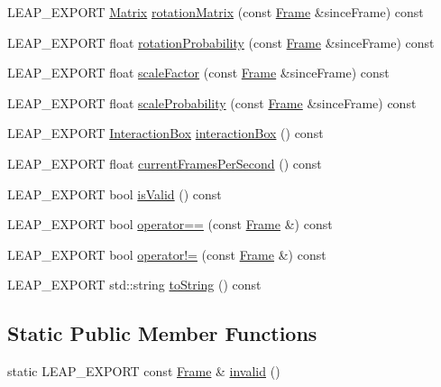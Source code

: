 \begin{DoxyCompactItemize}
\item 
L\+E\+A\+P\+\_\+\+E\+X\+P\+O\+R\+T \hyperlink{struct_leap_1_1_matrix}{Matrix} \hyperlink{class_leap_1_1_frame_a06fcbc22654ef3a06e657f6b55d94aaf}{rotation\+Matrix} (const \hyperlink{class_leap_1_1_frame}{Frame} \&since\+Frame) const 
\item 
L\+E\+A\+P\+\_\+\+E\+X\+P\+O\+R\+T float \hyperlink{class_leap_1_1_frame_a8005272f410431448620af1269ae0127}{rotation\+Probability} (const \hyperlink{class_leap_1_1_frame}{Frame} \&since\+Frame) const 
\item 
L\+E\+A\+P\+\_\+\+E\+X\+P\+O\+R\+T float \hyperlink{class_leap_1_1_frame_a8786d67154ab10f0b36f2b39c1e1541d}{scale\+Factor} (const \hyperlink{class_leap_1_1_frame}{Frame} \&since\+Frame) const 
\item 
L\+E\+A\+P\+\_\+\+E\+X\+P\+O\+R\+T float \hyperlink{class_leap_1_1_frame_addf9f652ce205b8a827fb3fe18345e36}{scale\+Probability} (const \hyperlink{class_leap_1_1_frame}{Frame} \&since\+Frame) const 
\item 
L\+E\+A\+P\+\_\+\+E\+X\+P\+O\+R\+T \hyperlink{class_leap_1_1_interaction_box}{Interaction\+Box} \hyperlink{class_leap_1_1_frame_abe8b9f619d30dec76b5cd5bfcabddf98}{interaction\+Box} () const 
\item 
L\+E\+A\+P\+\_\+\+E\+X\+P\+O\+R\+T float \hyperlink{class_leap_1_1_frame_a9a881e9c40c667c47c029a803fa2afa6}{current\+Frames\+Per\+Second} () const 
\item 
L\+E\+A\+P\+\_\+\+E\+X\+P\+O\+R\+T bool \hyperlink{class_leap_1_1_frame_ab5dc8d5562c21a65885999fda4d52a8f}{is\+Valid} () const 
\item 
L\+E\+A\+P\+\_\+\+E\+X\+P\+O\+R\+T bool \hyperlink{class_leap_1_1_frame_a6d26f359703ee46db2e50d3eb86e868a}{operator==} (const \hyperlink{class_leap_1_1_frame}{Frame} \&) const 
\item 
L\+E\+A\+P\+\_\+\+E\+X\+P\+O\+R\+T bool \hyperlink{class_leap_1_1_frame_ad8558771021e0904a9933cfedb491639}{operator!=} (const \hyperlink{class_leap_1_1_frame}{Frame} \&) const 
\item 
L\+E\+A\+P\+\_\+\+E\+X\+P\+O\+R\+T std\+::string \hyperlink{class_leap_1_1_frame_a94ec0c7a340f813d6e357d83891cf8e1}{to\+String} () const 
\end{DoxyCompactItemize}
\subsection*{Static Public Member Functions}
\begin{DoxyCompactItemize}
\item 
static L\+E\+A\+P\+\_\+\+E\+X\+P\+O\+R\+T const \hyperlink{class_leap_1_1_frame}{Frame} \& \hyperlink{class_leap_1_1_frame_a069854a98be43ae91a9f23058674d2eb}{invalid} ()
\end{DoxyCompactItemize}
